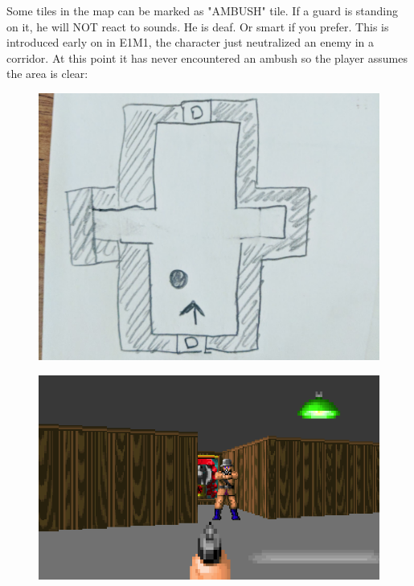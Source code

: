 \begin{minipage}{.45\textwidth}
Some tiles in the map can be marked as "AMBUSH" tile. If a guard is standing on it, he will NOT react to sounds. He is deaf. Or smart if you prefer. This is introduced early on in E1M1, the character just neutralized an enemy in a corridor. At this point it has never encountered an ambush so the player assumes the area is clear:\\
\end{minipage}
\begin{minipage}{.45\textwidth}
\begin{figure}[H]
 \centering
 \includegraphics[width=.5\textwidth]{imgs/ambush/map_unknown_drawing.png}
\end{figure}
\end{minipage}



\par
\begin{figure}[H]
 \centering
 \includegraphics[width=\textwidth]{imgs/ambush/map_ambushed.png}
\end{figure}
\par


